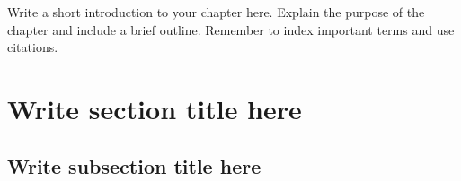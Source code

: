 
Write a short introduction to your chapter here. Explain the purpose
of the chapter and include a brief outline. Remember to index important
terms and use citations.~\cite{Cia78}


\section{Write section title here}
\label{sec:intro}

\subsection{Write subsection title here}
